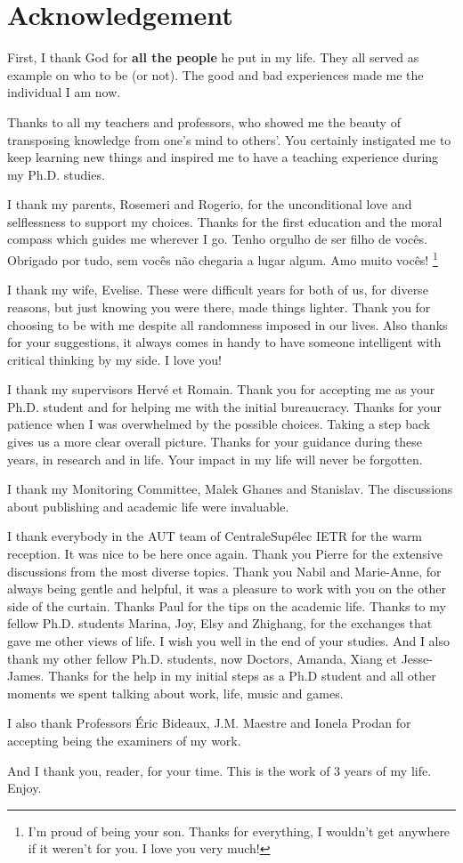 \documentclass[../main.tex]{subfiles}
\begin{document}
\chapter*{Acknowledgement}

First, I thank God for \textbf{all the people} he put in my life.
They all served as example on who to be (or not).
The good and bad experiences made me the individual I am now.

Thanks to all my teachers and professors, who showed me the beauty of transposing knowledge from one's mind to others'.
You certainly instigated me to keep learning new things and inspired me to have a teaching experience during my Ph.D. studies.

I thank my parents, Rosemeri and Rogerio, for the unconditional love and selflessness to support my choices.
Thanks for the first education and the moral compass which guides me wherever I go. Tenho orgulho de ser filho de vocês. Obrigado por tudo, sem vocês não chegaria a lugar algum. Amo muito vocês! \footnote{I'm proud of being your son. Thanks for everything, I wouldn't get anywhere if it weren't for you. I love you very much!}

I thank my wife, Evelise.
These were difficult years for both of us, for diverse reasons, but just knowing you were there, made things lighter.
Thank you for choosing to be with me despite all randomness imposed in our lives.
Also thanks for your suggestions, it always comes in handy to have someone intelligent with critical thinking by my side.
I love you!

I thank my supervisors Hervé et Romain.
Thank you for accepting me as your Ph.D. student and for helping me with the initial bureaucracy.
Thanks for your patience when I was overwhelmed by the possible choices.
Taking a step back gives us a more clear overall picture.
Thanks for your guidance during these years, in research and in life.
Your impact in my life will never be forgotten.

I thank my Monitoring Committee, Malek Ghanes and Stanislav.
The discussions about publishing and academic life were invaluable.

I thank everybody in the AUT team of CentraleSupélec IETR for the warm reception.
It was nice to be here once again.
Thank you Pierre for the extensive discussions from the most diverse topics.
Thank you Nabil and Marie-Anne, for always being gentle and helpful, it was a pleasure to work with you on the other side of the curtain.
Thanks Paul for the tips on the academic life.
Thanks to my fellow Ph.D. students Marina, Joy, Elsy and Zhighang, for the exchanges that gave me other views of life.
I wish you well in the end of your studies.
And I also thank my other fellow Ph.D. students, now Doctors, Amanda, Xiang et Jesse-James.
Thanks for the help in my initial steps as a Ph.D student and all other moments we spent talking about work, life, music and games.

I also thank Professors Éric Bideaux, J.M. Maestre and Ionela Prodan for accepting being the examiners of my work.

And I thank you, reader, for your time. This is the work of 3 years of my life. Enjoy.
\end{document}
